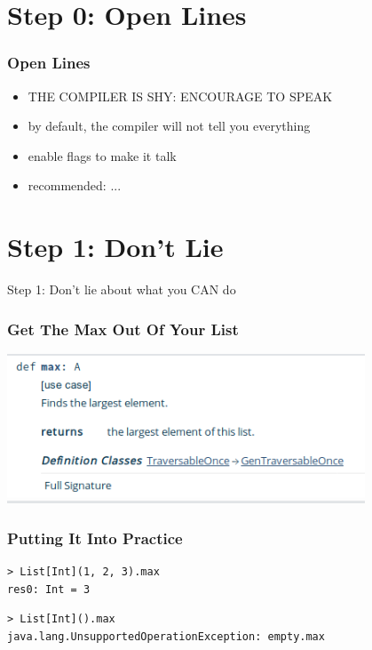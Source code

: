 \documentclass{beamer}
\begin{document}
\section{Step 0: Open Lines}

\begin{frame}
  \frametitle{Open Lines}
  \begin{itemize}
  \item THE COMPILER IS SHY: ENCOURAGE TO SPEAK
  \item by default, the compiler will not tell you everything
  \item enable flags to make it talk
  \item recommended: ...
  \end{itemize}
\end{frame}

\section{Step 1: Don't Lie}

\begin{frame}[c]
  \begin{center}
    \Large Step 1: Don't lie about what you CAN do
  \end{center}
\end{frame}

\begin{frame}[fragile]
  \frametitle{Get The Max Out Of Your List}
  \includegraphics[width=0.8\textwidth]{../pics/list-max.png}
\end{frame}

\begin{frame}
  \frametitle{Putting It Into Practice}
  \begin{verbatim}
> List[Int](1, 2, 3).max
res0: Int = 3
\end{verbatim}
\begin{verbatim}
> List[Int]().max                                                             
java.lang.UnsupportedOperationException: empty.max                                 
\end{verbatim}
\end{frame}
\end{document}
